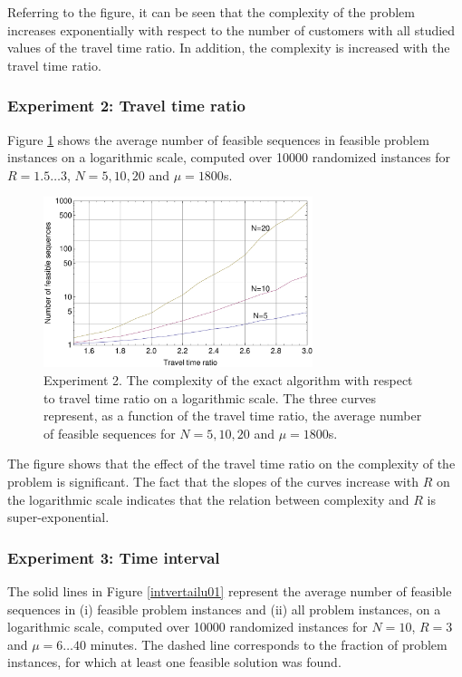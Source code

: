 \documentclass[dissertation,draft*]{aaltoseries}
\begin{document}
Referring to the figure, it can be seen that the complexity of the problem increases exponentially
with respect to the number of customers with all studied values of the travel time ratio.  
In addition, the complexity is increased with the travel time ratio. 



\subsubsection{Experiment 2: Travel time ratio}
Figure \ref{ttivertailu01} shows the average number of feasible sequences in feasible problem instances 
on a logarithmic scale, computed over 10000
randomized instances for $R=1.5\ldots 3$, $N = 5,10,20$ and $\mu = 1800$s. 

\begin{figure}[ht]
\begin{center}
\includegraphics[width=0.7\textwidth]{ttivertailu01.pdf}
\caption{Experiment 2. The complexity of the exact algorithm with respect to travel time ratio on a logarithmic scale. 
The three curves represent, as a function of the travel time ratio, the average number of feasible sequences
for $N=5,10,20$ and $\mu = 1800$s.}
\label{ttivertailu01}
\end{center}
\end{figure}


The figure shows that the effect of the travel time ratio on the complexity of the problem is significant.
The fact that the slopes of the curves increase with $R$ on the logarithmic scale indicates that the relation 
between complexity and $R$ is super-exponential.






\subsubsection{Experiment 3: Time interval}
The solid lines in Figure \ref{intvertailu01} represent the average number of feasible sequences in
(i) feasible problem instances and (ii) all problem instances, on a logarithmic scale, computed over 10000
randomized instances for $N=10$, $R=3$ and $\mu = 6 \ldots 40$ minutes. The dashed line corresponds to the fraction
of problem instances, for which at least one feasible solution was found.
\end{document}
